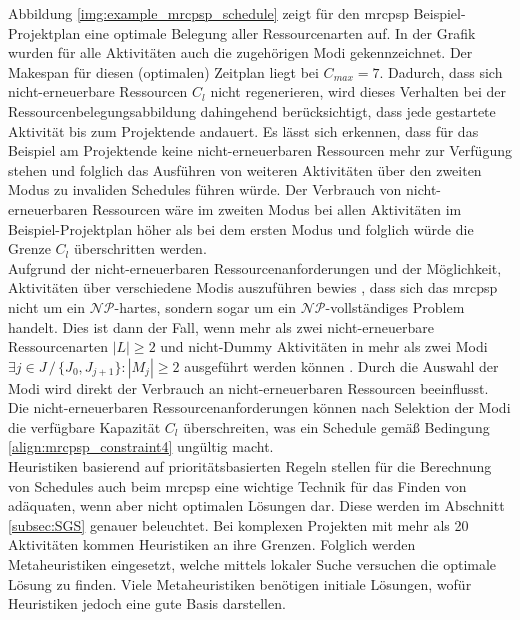 Abbildung \ref{img:example_mrcpsp_schedule} zeigt für den \ac{mrcpsp} Beispiel-Projektplan eine optimale Belegung aller Ressourcenarten auf. In der Grafik wurden für alle Aktivitäten auch die zugehörigen Modi gekennzeichnet. Der Makespan für diesen (optimalen) Zeitplan liegt bei $C_{max} = 7$. Dadurch, dass sich nicht-erneuerbare Ressourcen $C_l$ nicht regenerieren, wird dieses Verhalten bei der Ressourcenbelegungsabbildung dahingehend berücksichtigt, dass jede gestartete Aktivität bis zum Projektende andauert. Es lässt sich erkennen, dass für das Beispiel am Projektende keine nicht-erneuerbaren Ressourcen mehr zur Verfügung stehen und folglich das Ausführen von weiteren Aktivitäten über den zweiten Modus zu invaliden Schedules führen würde. Der Verbrauch von nicht-erneuerbaren Ressourcen wäre im zweiten Modus bei allen Aktivitäten im Beispiel-Projektplan höher als bei dem ersten Modus und folglich würde die Grenze $C_l$ überschritten werden. \\
Aufgrund der nicht-erneuerbaren Ressourcenanforderungen und der Möglichkeit, Aktivitäten über verschiedene Modis auszuführen bewies \cite[S. 3 f.]{kolisch_local_1997}, dass sich das \ac{mrcpsp} nicht um ein $\mathcal{NP}$-hartes, sondern sogar um ein $\mathcal{NP}$-vollständiges Problem handelt. Dies ist dann der Fall, wenn mehr als zwei nicht-erneuerbare Ressourcenarten $|L| \geq 2$ und nicht-Dummy Aktivitäten in mehr als zwei Modi $\exists j \in J \, / \, \{ J_0, J_{j+1} \}: |M_j| \geq 2$ ausgeführt werden können \cite[vgl.][S. 3 f.]{kolisch_local_1997}. Durch die Auswahl der Modi wird direkt der Verbrauch an nicht-erneuerbaren Ressourcen beeinflusst. Die nicht-erneuerbaren Ressourcenanforderungen können nach Selektion der Modi die verfügbare Kapazität $C_l$ überschreiten, was ein Schedule gemäß Bedingung \ref{align:mrcpsp_constraint4} ungültig macht. \\

Heuristiken basierend auf prioritätsbasierten Regeln stellen für die Berechnung von Schedules auch beim \ac{mrcpsp} eine wichtige Technik für das Finden von adäquaten, wenn aber nicht optimalen Lösungen dar. Diese werden im Abschnitt \ref{subsec:SGS} genauer beleuchtet. Bei komplexen Projekten mit mehr als 20 Aktivitäten kommen Heuristiken an ihre Grenzen. Folglich werden Metaheuristiken eingesetzt, welche mittels lokaler Suche versuchen die optimale Lösung zu finden. Viele Metaheuristiken benötigen initiale Lösungen, wofür Heuristiken jedoch eine gute Basis darstellen. \cite[vgl.][S. 69 f.]{lova_multi-mode_2006} 